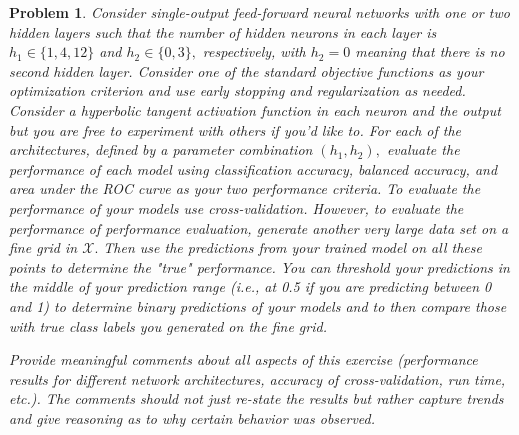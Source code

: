 \documentclass[10pt]{article}
\newtheorem{problem}{Problem}
\begin{document}
\begin{problem}
Consider single-output feed-forward neural networks with one or two hidden layers such that the number of hidden neurons in each layer is $h_{1} \in\{1,4,12\}$ and $h_{2} \in\{0,3\},$ respectively, with $h_{2}=0$ meaning that there is no second hidden layer. Consider one of the standard objective functions as your optimization criterion and use early stopping and regularization as needed. Consider a hyperbolic tangent activation function in each neuron and the output but you are free to experiment with others if you'd like to. For each of the architectures, defined by a parameter combination $\left(h_{1}, h_{2}\right),$ evaluate the performance of each model using classification accuracy, balanced accuracy, and area under the ROC curve as your two performance criteria. To evaluate the performance of your models use cross-validation. However, to evaluate the performance of performance evaluation, generate another very large data set on a fine grid in $\mathcal{X} .$ Then use the predictions from your trained model on all these points to determine the "true" performance. You can threshold your predictions in the middle of your prediction range (i.e., at 0.5 if you are predicting between 0 and 1) to determine binary predictions of your models and to then compare those with true class labels you generated on the fine grid.

Provide meaningful comments about all aspects of this exercise (performance results for different network architectures, accuracy of cross-validation, run time, etc.). The comments should not just re-state the results but rather capture trends and give reasoning as to why certain behavior was observed.
\end{problem}
\end{document}
